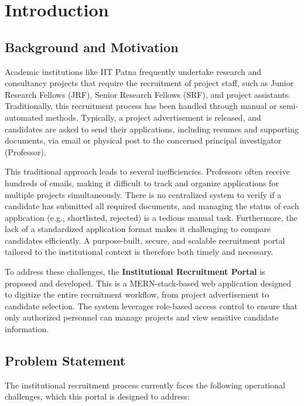 \chapter{Introduction}
\hspace{3mm}

\section{Background and Motivation}

Academic institutions like IIT Patna frequently undertake research and consultancy projects that require the recruitment of project staff, such as Junior Research Fellows (JRF), Senior Research Fellows (SRF), and project assistants. Traditionally, this recruitment process has been handled through manual or semi-automated methods. Typically, a project advertisement is released, and candidates are asked to send their applications, including resumes and supporting documents, via email or physical post to the concerned principal investigator (Professor).

This traditional approach leads to several inefficiencies. Professors often receive hundreds of emails, making it difficult to track and organize applications for multiple projects simultaneously. There is no centralized system to verify if a candidate has submitted all required documents, and managing the status of each application (e.g., shortlisted, rejected) is a tedious manual task. Furthermore, the lack of a standardized application format makes it challenging to compare candidates efficiently. A purpose-built, secure, and scalable recruitment portal tailored to the institutional context is therefore both timely and necessary.

To address these challenges, the \textbf{Institutional Recruitment Portal} is proposed and developed. This is a MERN-stack-based web application designed to digitize the entire recruitment workflow, from project advertisement to candidate selection. The system leverages role-based access control to ensure that only authorized personnel can manage projects and view sensitive candidate information.

\section{Problem Statement}

The institutional recruitment process currently faces the following operational challenges, which this portal is designed to address:

